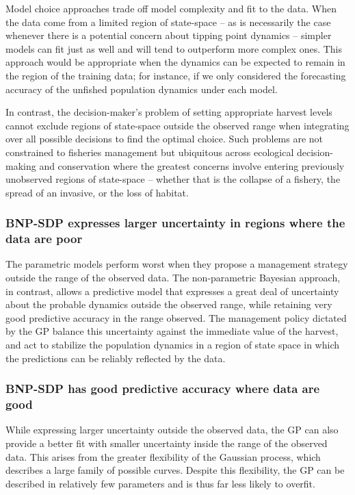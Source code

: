 \documentclass[author-year, review]{elsarticle} %
\begin{document}
Model choice approaches trade off model complexity and fit to the data.
When the data come from a limited region of state-space -- as is
necessarily the case whenever there is a potential concern about tipping
point dynamics -- simpler models can fit just as well and will tend to
outperform more complex ones. This approach would be appropriate when
the dynamics can be expected to remain in the region of the training
data; for instance, if we only considered the forecasting accuracy of
the unfished population dynamics under each model.

In contrast, the decision-maker's problem of setting appropriate harvest
levels cannot exclude regions of state-space outside the observed range
when integrating over all possible decisions to find the optimal choice.
Such problems are not constrained to fisheries management but ubiquitous
across ecological decision-making and conservation where the greatest
concerns involve entering previously unobserved regions of state-space
-- whether that is the collapse of a fishery, the spread of an invasive,
or the loss of habitat.

\subsubsection{BNP-SDP expresses larger uncertainty in regions where the
data are
poor}\label{bnp-sdp-expresses-larger-uncertainty-in-regions-where-the-data-are-poor}

The parametric models perform worst when they propose a management
strategy outside the range of the observed data. The non-parametric
Bayesian approach, in contrast, allows a predictive model that expresses
a great deal of uncertainty about the probable dynamics outside the
observed range, while retaining very good predictive accuracy in the
range observed. The management policy dictated by the GP balance this
uncertainty against the immediate value of the harvest, and act to
stabilize the population dynamics in a region of state space in which
the predictions can be reliably reflected by the data.

\subsubsection{BNP-SDP has good predictive accuracy where data are
good}\label{bnp-sdp-has-good-predictive-accuracy-where-data-are-good}

While expressing larger uncertainty outside the observed data, the GP
can also provide a better fit with smaller uncertainty inside the range
of the observed data. This arises from the greater flexibility of the
Gaussian process, which describes a large family of possible curves.
Despite this flexibility, the GP can be described in relatively few
parameters and is thus far less likely to overfit.
\end{document}
